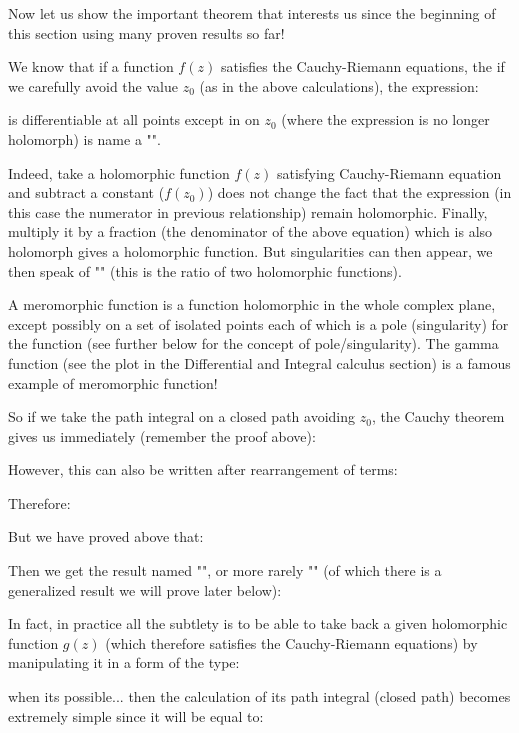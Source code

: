 	Now let us show the important theorem that interests us since the beginning of this section using many proven results so far!
	
	We know that if a function $f (z)$ satisfies the Cauchy-Riemann equations, the if we carefully avoid the value $z_0$ (as in the above calculations), the expression:
	
	is differentiable at all points except in on $z_0$ (where the expression is no longer holomorph) is name a "".

	Indeed, take a holomorphic function $f (z)$ satisfying Cauchy-Riemann equation and subtract a constant ($f(z_0)$) does not change the fact that the expression (in this case the numerator in previous relationship) remain holomorphic. Finally, multiply it by a fraction (the denominator of the above equation) which is also holomorph gives a holomorphic function. But singularities can then appear, we then speak of "" (this is the ratio of two holomorphic functions).
	\begin{tcolorbox}[title=Remarks,colframe=black,arc=10pt]
	A meromorphic function is a function holomorphic in the whole complex plane, except possibly on a set of isolated points each of which is a pole (singularity) for the function (see further below for the concept of pole/singularity). The gamma function (see the plot in the Differential and Integral calculus section) is a famous example of meromorphic function!
	\end{tcolorbox}	
	So if we take the path integral on a closed path avoiding $z_0$, the Cauchy theorem gives us immediately (remember the proof above):
	
	However, this can also be written after rearrangement of terms:
	
	Therefore:
	
	But we have proved above that:
	
	Then we get the result named "", or more rarely "" (of which there is a generalized result we will prove later below):
	
	In fact, in practice all the subtlety is to be able to take back a given holomorphic function $g(z)$ (which therefore satisfies the Cauchy-Riemann equations) by manipulating it in a form of the type:
	
	when its possible... then the calculation of its path integral (closed path) becomes extremely simple since it will be equal to:
	
